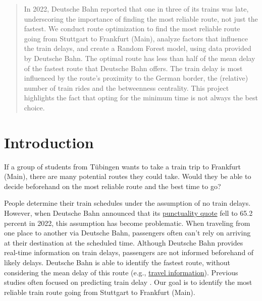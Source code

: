 \documentclass{article}
\theoremstyle{plain}
\theoremstyle{definition}
\theoremstyle{remark}
\begin{document}
	\printAffiliationsAndNotice{\icmlEqualContribution} %
	
	\begin{abstract}
		In 2022, Deutsche Bahn reported that one in three of its trains was late, underscoring the importance of finding the most reliable route, not just the fastest. We conduct route optimization to find the most reliable route going from Stuttgart to Frankfurt (Main), analyze factors that influence the train delays, and create a Random Forest model, using data provided by Deutsche Bahn. The optimal route has less than half of the mean delay of the fastest route that Deutsche Bahn offers. The train delay is most influenced by the route's proximity to the German border, the (relative) number of train rides and the betweenness centrality. This project highlights the fact that opting for the minimum time is not always the best choice.
	\end{abstract}
	
	\section{Introduction}\label{sec:intro}
	If a group of students from Tübingen wants to take a train trip to Frankfurt (Main), there are many potential routes they could take. Would they be able to decide beforehand on the most reliable route and the best time to go?
	
	People determine their train schedules under the assumption of no train delays. However, when Deutsche Bahn announced that its \href{https://zbir.deutschebahn.com/2023/en/interim-group-management-report-unaudited/product-quality-and-digitalization/punctuality/}{punctuality quote} fell to 65.2 percent in 2022, this assumption has become problematic. When traveling from one place to another via Deutsche Bahn, passengers often can't rely on arriving at their destination at the scheduled time. Although Deutsche Bahn provides real-time information on train delays, passengers are not informed beforehand of likely delays. Deutsche Bahn is able to identify the fastest route, without considering the mean delay of this route (e.g., \href{https://www.bahn.de/buchung/intern/start}{travel information}). Previous studies often focused on predicting train delay \cite{predtraindelay, largetrainnet, MLtraindel}. Our goal is to identify the most reliable train route going from Stuttgart to Frankfurt (Main).
	
\end{document}
